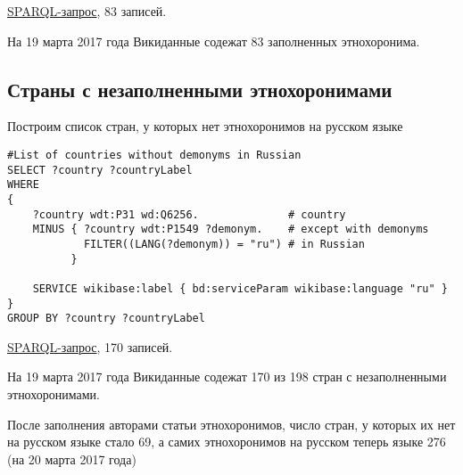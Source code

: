 \href{https://query.wikidata.org/#%23List%20of%20demonym%20on%20russian%20language%0ASELECT%20%3Fcountry%20%3FcountryLabel%20%3Fdemonym%0AWHERE%0A%7B%0A%09%3Fcountry%20wdt%3AP31%20wd%3AQ6256.%20%20%20%20%20%20%23country%0A%09%3Fcountry%20wdt%3AP1549%20%3Fdemonym%20.%20%20%20%23demonym%0A%09FILTER%28%28LANG%28%3Fdemonym%29%29%20%3D%20%22ru%22%29%0A%09SERVICE%20wikibase%3Alabel%20%7B%20bd%3AserviceParam%20wikibase%3Alanguage%20%22ru%22%20%7D%0A%7D}{SPARQL-запрос}, 83 записей.

На 19 марта 2017 года Викиданные содежат 83 заполненных этнохоронима.

\subsection{Страны с незаполненными этнохоронимами}

Построим список стран, у которых нет этнохоронимов на русском языке

\begin{lstlisting}[language=SPARQL]
#List of countries without demonyms in Russian
SELECT ?country ?countryLabel 
WHERE
{
	?country wdt:P31 wd:Q6256.              # country
	MINUS { ?country wdt:P1549 ?demonym.    # except with demonyms
            FILTER((LANG(?demonym)) = "ru") # in Russian
          }    
    
	SERVICE wikibase:label { bd:serviceParam wikibase:language "ru" }
}
GROUP BY ?country ?countryLabel
\end{lstlisting}

\href{https://query.wikidata.org/#%23List%20of%20countries%20without%20demonyms%20in%20Russian%20language%0ASELECT%20%3Fcountry%20%3FcountryLabel%20%0AWHERE%0A%7B%0A%09%3Fcountry%20wdt%3AP31%20wd%3AQ6256.%20%20%20%20%20%20%20%20%20%20%20%20%20%20%23%20country%0A%09MINUS%20%7B%20%3Fcountry%20wdt%3AP1549%20%3Fdemonym.%20%20%20%20%23%20except%20with%20demonyms%0A%20%20%20%20%20%20%20%20%20%20%20%20FILTER%28%28LANG%28%3Fdemonym%29%29%20%3D%20%22ru%22%29%20%23%20in%20Russian%0A%20%20%20%20%20%20%20%20%20%20%7D%20%20%20%20%0A%20%20%20%20%0A%09SERVICE%20wikibase%3Alabel%20%7B%20bd%3AserviceParam%20wikibase%3Alanguage%20%22ru%22%20%7D%0A%7D%0AGROUP%20BY%20%3Fcountry%20%3FcountryLabel SPARQL query}{SPARQL-запрос}, 170 записей. 

На 19 марта 2017 года Викиданные содежат 170 из 198 стран с незаполненными этнохоронимами.

После заполнения авторами статьи этнохоронимов, число стран, у которых их нет на русском языке стало 69, а самих этнохоронимов на русском теперь языке 276 (на 20 марта 2017 года)
